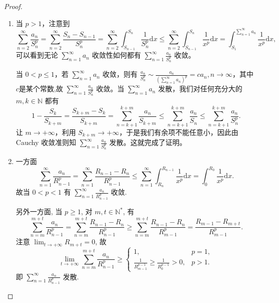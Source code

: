 \documentclass[../../main.tex]{subfiles}%
\begin{document}
\begin{proof}
\begin{enumerate}
\item 当 \( p > 1 \)，注意到
\[
\sum_{n = 2}^{\infty} \frac{a_n}{S_n^p} = \sum_{n = 2}^{\infty} \frac{S_n - S_{n - 1}}{S_n^p} = \sum_{n = 2}^{\infty} \int_{S_{n - 1}}^{S_n} \frac{1}{S_n^p} \mathrm{d}x \leqslant \sum_{n = 2}^{\infty} \int_{S_{n - 1}}^{S_n} \frac{1}{x^p} \mathrm{d}x = \int_{S_1}^{\sum\limits_{n = 1}^{\infty} a_n} \frac{1}{x^p} \mathrm{d}x,
\]
可以看到无论 \( \sum_{n = 1}^{\infty} a_n \) 收敛性如何都有 \( \sum_{n = 1}^{\infty} \frac{a_n}{S_n^p} \) 收敛。

当 \( 0 < p \leqslant 1 \)，若 \( \sum_{n = 1}^{\infty} a_n \) 收敛，则有 \( \frac{a_n}{S_n^p} \sim \frac{a_n}{\left( \sum\limits_{n = 1}^{\infty} a_n \right)^p}=ca_n, n \to \infty \)，其中$c$是某个常数,故 \( \sum_{n = 1}^{\infty} \frac{a_n}{S_n^p} \) 收敛。当 \( \sum_{n = 1}^{\infty} a_n \) 发散，我们对任何充分大的 \( m, k \in \mathbb{N} \) 都有
\[
1 - \frac{S_k}{S_{k + m}} = \frac{S_{k + m} - S_k}{S_{k + m}} = \sum_{n = k + 1}^{k + m} \frac{a_n}{S_{k + m}} \leqslant \sum_{n = k + 1}^{k + m} \frac{a_n}{S_n} \leqslant \sum_{n = k + 1}^{k + m} \frac{a_n}{S_n^p}.
\]
让 \( m \to +\infty \)，利用 \( S_{k + m} \to +\infty \)，于是我们有余项不能任意小，因此由 Cauchy 收敛准则知 \( \sum_{n = 1}^{\infty} \frac{a_n}{S_n^p} \) 发散。这就完成了证明。

\item 一方面
\[
\sum_{n=1}^{\infty} \frac{a_n}{R_{n-1}^p} = \sum_{n=1}^{\infty} \frac{R_{n-1} - R_n}{R_{n-1}^p} \leqslant \sum_{n=1}^{\infty} \int_{R_n}^{R_{n-1}} \frac{1}{x^p} \mathrm{d}x = \int_{0}^{R_0} \frac{1}{x^p} \mathrm{d}x.
\]
故当 \( 0 < p < 1 \) 有 \( \sum_{n=1}^{\infty} \frac{a_n}{R_{n-1}^p} \) 收敛.

另外一方面, 当 \( p \geqslant 1 \), 对 \( m,t \in \mathbb{N}^* \), 有
\[
\sum_{n=m}^{m+t} \frac{a_n}{R_{n-1}^p} = \sum_{n=m}^{m+t} \frac{R_{n-1} - R_n}{R_{n-1}^p} \geqslant \sum_{n=m}^{m+t} \frac{R_{n-1} - R_n}{R_{m-1}^p} = \frac{R_{m-1} - R_{m+t}}{R_{m-1}^p}.
\]
注意 \( \lim_{t \to +\infty} R_{m+t} = 0 \), 故
\[
\lim_{t \to +\infty} \sum_{n=m}^{m+t} \frac{a_n}{R_{n-1}^p} \geqslant \begin{cases}
1, & p = 1, \\
\frac{1}{R_{m-1}^{p-1}} \geqslant \frac{1}{R_0^{p-1}} > 0, & p > 1.
\end{cases}
\]
即 \( \sum_{n=1}^{\infty} \frac{a_n}{R_{n-1}^p} \) 发散.
\end{enumerate}

\end{proof}
\end{document}
